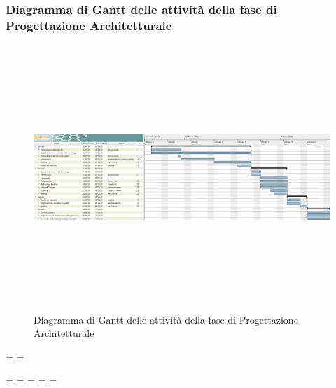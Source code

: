 \subsubsection{Diagramma di Gantt delle attività della fase di Progettazione Architetturale}
\pagestyle{empty}
\begin{figure}[h]
	\includegraphics[height = 10cm, width = 24.5cm]{Sezioni/Immagini/DiagrammiGantt/ProgettazioneArchitetturale.png}
	\centering
	\caption{Diagramma di Gantt delle attività della fase di Progettazione Architetturale}	
\end{figure}

\textwidth=\hsize
\textheight=\vsize

\endgroup
\newpage
\paperwidth=\pdfpageheight
\paperheight=\pdfpagewidth
\pdfpageheight=\paperheight
\pdfpagewidth=\paperwidth
\headwidth=\textwidth